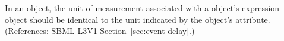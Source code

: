 In an \Event object, the unit of measurement associated with a \Delay
object's  expression object should be identical to the unit
indicated by the \Model object's  attribute.  (References:
SBML L3V1 Section~\ref{sec:event-delay}.)
